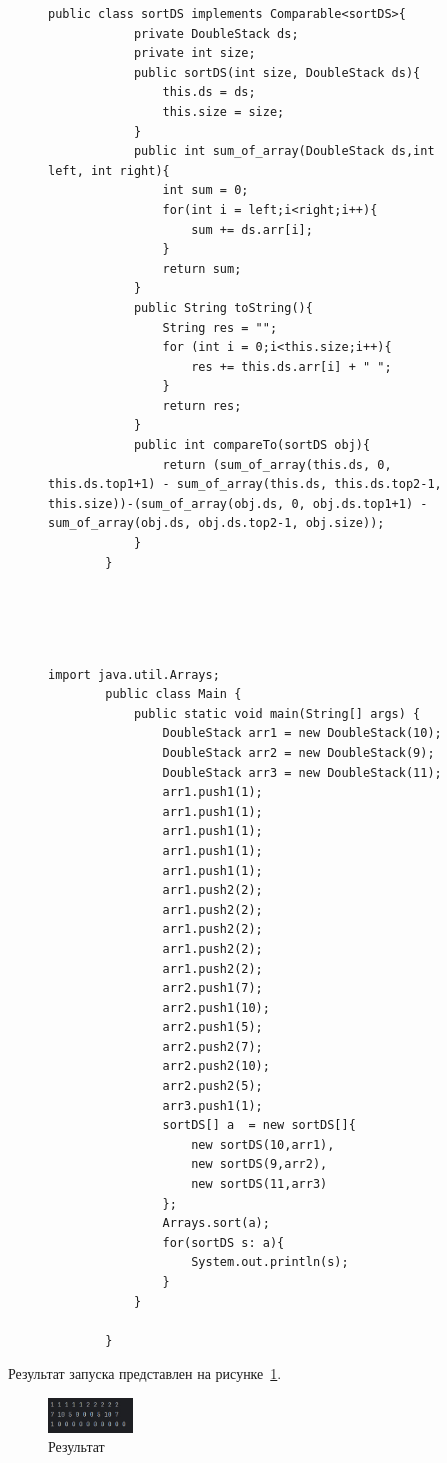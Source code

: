 \documentclass[a4paper, 14pt]{extarticle}
\begin{document}
\newpage
	
	\begin{figure}[!htb]
		\begin{lstlisting}[language={},caption={Класс sortDS, в котором реализована программа по заданию},label={lst:code2}]
		public class sortDS implements Comparable<sortDS>{
			private DoubleStack ds;
			private int size;
			public sortDS(int size, DoubleStack ds){
				this.ds = ds;
				this.size = size;
			}
			public int sum_of_array(DoubleStack ds,int left, int right){
				int sum = 0;
				for(int i = left;i<right;i++){
					sum += ds.arr[i];
				}
				return sum;
			}
			public String toString(){
				String res = "";
				for (int i = 0;i<this.size;i++){
					res += this.ds.arr[i] + " ";
				}
				return res;
			}
			public int compareTo(sortDS obj){
				return (sum_of_array(this.ds, 0, this.ds.top1+1) - sum_of_array(this.ds, this.ds.top2-1, this.size))-(sum_of_array(obj.ds, 0, obj.ds.top1+1) - sum_of_array(obj.ds, obj.ds.top2-1, obj.size));
			}
		}
		
			
			
			
		\end{lstlisting}
	\end{figure}
	
	\newpage
	
	\begin{figure}[!htb]
		\begin{lstlisting}[language={},caption={Класс Main, в котором реализована проверка работы класса sortDS},label={lst:code3}]
		import java.util.Arrays;
		public class Main {
			public static void main(String[] args) {
				DoubleStack arr1 = new DoubleStack(10);
				DoubleStack arr2 = new DoubleStack(9);
				DoubleStack arr3 = new DoubleStack(11);
				arr1.push1(1);
				arr1.push1(1);
				arr1.push1(1);
				arr1.push1(1);
				arr1.push1(1);
				arr1.push2(2);
				arr1.push2(2);
				arr1.push2(2);
				arr1.push2(2);
				arr1.push2(2);
				arr2.push1(7);
				arr2.push1(10);
				arr2.push1(5);
				arr2.push2(7);
				arr2.push2(10);
				arr2.push2(5);
				arr3.push1(1);
				sortDS[] a  = new sortDS[]{
					new sortDS(10,arr1),
					new sortDS(9,arr2),
					new sortDS(11,arr3)
				};
				Arrays.sort(a);
				for(sortDS s: a){
					System.out.println(s);
				}
			}
			
		}
		\end{lstlisting}
	\end{figure}
	
	Результат запуска представлен на рисунке~\ref{fig:img1}.
	
	\begin{figure}[!htb]
		\centering
		\includegraphics[width=0.2\textwidth]{img1}
		\caption{Результат}
		\label{fig:img1}
	\end{figure}
	
\end{document}
